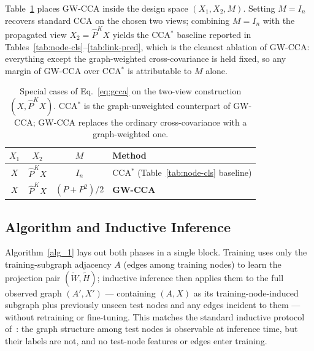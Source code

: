 \documentclass{article}
\begin{document}
Table~\ref{tab:special-cases} places GW-CCA inside the design space
$(X_1, X_2, M)$. Setting $M = I_n$ recovers standard CCA on the chosen two
views; combining $M = I_n$ with the propagated view $X_2 = \widehat{P}^K X$
yields the CCA$^\ast$ baseline reported in
Tables~\ref{tab:node-cls}--\ref{tab:link-pred}, which is the cleanest
ablation of GW-CCA: everything except the graph-weighted cross-covariance
is held fixed, so any margin of GW-CCA over CCA$^\ast$ is attributable to
$M$ alone.

\begin{table}[ht]
\caption{Special cases of Eq.~\ref{eq:gcca} on the two-view construction
$(X, \widehat{P}^K X)$. CCA$^\ast$ is the graph-unweighted counterpart of
GW-CCA; GW-CCA replaces the ordinary cross-covariance with a
graph-weighted one.}
\label{tab:special-cases}
\centering
\begin{tabular}{cccl}
\toprule
$X_1$ & $X_2$ & $M$ & Method \\
\midrule
$X$               & $\widehat{P}^K X$ & $I_n$            & CCA$^\ast$ (Table~\ref{tab:node-cls} baseline) \\
$X$               & $\widehat{P}^K X$ & $(P + P^2)/2$    & \textbf{GW-CCA} \\
\bottomrule
\end{tabular}
\end{table}

\subsection{Algorithm and Inductive Inference}
\label{sec:apply:algorithm}

Algorithm~\ref{alg_1} lays out both phases in a single block. Training uses
only the training-subgraph adjacency $A$ (edges among training nodes) to
learn the projection pair $(\widetilde{W}, \widetilde{H})$; inductive
inference then applies them to the full observed graph $(A', X')$ ---
containing $(A, X)$ as its training-node-induced subgraph plus previously
unseen test nodes and any edges incident to them --- without retraining or
fine-tuning. This matches the standard inductive protocol
of~\citet{hamilton2017inductive}: the graph structure among test nodes is
observable at inference time, but their labels are not, and no test-node
features or edges enter training.
\end{document}
